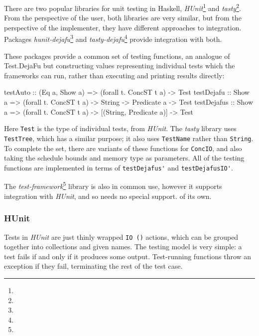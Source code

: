 There are two popular libraries for unit testing in Haskell,
\emph{HUnit}\footnote{} and
\emph{tasty}\footnote{}. From the perspective of the
user, both libraries are very similar, but from the perspective of the
implementer, they have different approaches to integration. Packages
\emph{hunit-dejafu}\footnote{} and
\emph{tasty-dejafu}\footnote{} provide
integration with both.

These packages provide a common set of testing functions, an analogue
of Test.DejaFu but constructing values representing individual tests
which the frameworks can run, rather than executing and printing
results directly:

\begin{haskellcode}
testAuto    :: (Eq a, Show a) => (forall t. ConcST t a) -> Test
testDejafu  :: Show a => (forall t. ConcST t a) -> String -> Predicate a -> Test
testDejafus :: Show a => (forall t. ConcST t a) -> [(String, Predicate a)] -> Test
\end{haskellcode}

Here \verb|Test| is the type of individual tests, from
\emph{HUnit}. The \emph{tasty} library uses \verb|TestTree|, which has
a similar purpose; it also uses \verb|TestName| rather than
\verb|String|. To complete the set, there are variants of these
functions for \verb|ConcIO|, and also taking the schedule bounds and
memory type as parameters. All of the testing functions are
implemented in terms of \verb|testDejafus'| and \verb|testDejafusIO'|.

The \emph{test-framework}\footnote{} library
is also in common use, however it supports integration with
\emph{HUnit}, and so needs no special support. of its own.

\subsubsection{HUnit}
\label{sec:practice-integration-hunit}

Tests in \emph{HUnit} are just thinly wrapped \verb|IO ()| actions,
which can be grouped together into collections and given names. The
testing model is very simple: a test fails if and only if it produces
some output. Test-running functions throw an exception if they fail,
terminating the rest of the test case.


